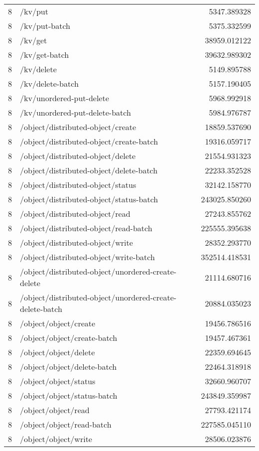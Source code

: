 \begin{longtable}{rlr}
8 & /kv/put & 5347.389328 \\
8 & /kv/put-batch & 5375.332599 \\
8 & /kv/get & 38959.012122 \\
8 & /kv/get-batch & 39632.989302 \\
8 & /kv/delete & 5149.895788 \\
8 & /kv/delete-batch & 5157.190405 \\
8 & /kv/unordered-put-delete & 5968.992918 \\
8 & /kv/unordered-put-delete-batch & 5984.976787 \\
8 & /object/distributed-object/create & 18859.537690 \\
8 & /object/distributed-object/create-batch & 19316.059717 \\
8 & /object/distributed-object/delete & 21554.931323 \\
8 & /object/distributed-object/delete-batch & 22233.352528 \\
8 & /object/distributed-object/status & 32142.158770 \\
8 & /object/distributed-object/status-batch & 243025.850260 \\
8 & /object/distributed-object/read & 27243.855762 \\
8 & /object/distributed-object/read-batch & 225555.395638 \\
8 & /object/distributed-object/write & 28352.293770 \\
8 & /object/distributed-object/write-batch & 352514.418531 \\
8 & /object/distributed-object/unordered-create-delete & 21114.680716 \\
8 & /object/distributed-object/unordered-create-delete-batch & 20884.035023 \\
8 & /object/object/create & 19456.786516 \\
8 & /object/object/create-batch & 19457.467361 \\
8 & /object/object/delete & 22359.694645 \\
8 & /object/object/delete-batch & 22464.318918 \\
8 & /object/object/status & 32660.960707 \\
8 & /object/object/status-batch & 243849.359987 \\
8 & /object/object/read & 27793.421174 \\
8 & /object/object/read-batch & 227585.045110 \\
8 & /object/object/write & 28506.023876 \\

\end{longtable}
